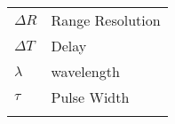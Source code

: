 \begin{longtable}{ p{}  p{} } 

$\Delta R$ & Range Resolution \\
$ \Delta T $ & Delay\\
$\lambda $ & wavelength \\
$\tau $ & Pulse Width \\
\addlinespace[15pt]
\end{longtable}
